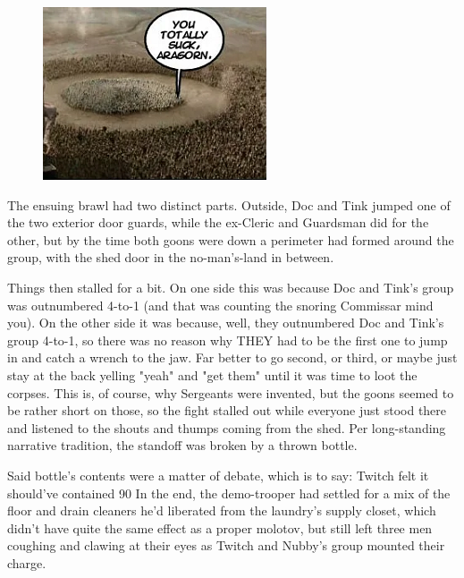 \begin{figure}
	\begin{center}
		\includegraphics[width=\figwidth]{pics/21/48.png}
	\end{center}
\end{figure}
The ensuing brawl had two distinct parts. 
Outside, Doc and Tink jumped one of the two exterior door guards, while the ex-Cleric and Guardsman did for the other, but by the time both goons were down a perimeter had formed around the group, with the shed door in the no-man's-land in between. 


Things then stalled for a bit. 
On one side this was because Doc and Tink's group was outnumbered 4-to-1 (and that was counting the snoring Commissar mind you). 
On the other side it was because, well, they outnumbered Doc and Tink's group 4-to-1, so there was no reason why THEY had to be the first one to jump in and catch a wrench to the jaw. 
Far better to go second, or third, or maybe just stay at the back yelling "yeah" and "get them" until it was time to loot the corpses. 
This is, of course, why Sergeants were invented, but the goons seemed to be rather short on those, so the fight stalled out while everyone just stood there and listened to the shouts and thumps coming from the shed. 
Per long-standing narrative tradition, the standoff was broken by a thrown bottle.

Said bottle's contents were a matter of debate, which is to say: 
Twitch felt it should've contained 90%
In the end, the demo-trooper had settled for a mix of the floor and drain cleaners he'd liberated from the laundry's supply closet, which didn't have quite the same effect as a proper molotov, but still left three men coughing and clawing at their eyes as Twitch and Nubby's group mounted their charge.

